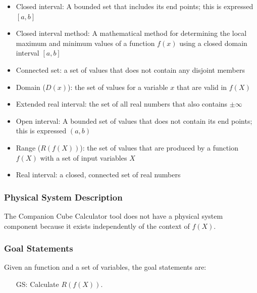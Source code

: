 \documentclass[12pt]{article}
\newcounter{goalnum} %
\newcommand{\progname}{Companion Cube Calculator} %
\begin{document}
\begin{itemize}

\item Closed interval: A bounded set that includes its end points; this is 
expressed $[a,b]$
\item Closed interval method: A mathematical method for determining the local 
maximum and minimum values of a function $f(x)$ using a closed domain interval 
$[a,b]$
\item Connected set: a set of values that does not contain any disjoint members
\item Domain ($D(x)$): the set of values for a variable $x$ that are valid in 
$f(X)$
\item Extended real interval: the set of all real numbers that also contains 
$\pm \infty$
\item Open interval: A bounded set of values that does not contain its end 
points; this is expressed $(a,b)$
\item Range ($R(f(X))$): the set of values that are produced by a function 
$f(X)$ with a set of input variables $X$
\item Real interval: a closed, connected set of real numbers

\end{itemize}

\subsubsection{Physical System Description}

The \progname{} tool does not have a physical system component because it 
exists independently of the context of $f(X)$. 

\subsubsection{Goal Statements}

\noindent Given an function and a set of variables, the goal statements are:

\begin{itemize}

\item[GS\refstepcounter{goalnum}\thegoalnum \label{G_range}:] 
Calculate $R(f(X))$.


\end{itemize}
\end{document}
